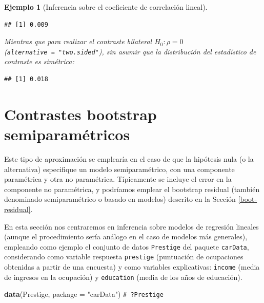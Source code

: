 \documentclass[
]{book}
\newenvironment{Shaded}{\begin{snugshade}}{\end{snugshade}}
\newcommand{\AttributeTok}[1]{\textcolor[rgb]{0.13,0.29,0.53}{#1}}
\newcommand{\CommentTok}[1]{\textcolor[rgb]{0.56,0.35,0.01}{\textit{#1}}}
\newcommand{\DecValTok}[1]{\textcolor[rgb]{0.00,0.00,0.81}{#1}}
\newcommand{\FunctionTok}[1]{\textcolor[rgb]{0.13,0.29,0.53}{\textbf{#1}}}
\newcommand{\NormalTok}[1]{#1}
\newcommand{\OtherTok}[1]{\textcolor[rgb]{0.56,0.35,0.01}{#1}}
\newcommand{\SpecialCharTok}[1]{\textcolor[rgb]{0.81,0.36,0.00}{\textbf{#1}}}
\newcommand{\StringTok}[1]{\textcolor[rgb]{0.31,0.60,0.02}{#1}}
\theoremstyle{break}
\newtheorem{example}{Ejemplo}[chapter]
\theoremstyle{nonumberplain}
\renewcommand{\CommentTok}[1]{\textcolor[rgb]{0.41,0.41,0.41}{\texttt{#1}}}
\begin{document}
\begin{example}[Inferencia sobre el coeficiente de correlación lineal]
\begin{verbatim}
## [1] 0.009
\end{verbatim}

Mientras que para realizar el contraste bilateral \(H_0: \rho = 0\)
(\texttt{alternative\ =\ "two.sided"}), sin asumir que
la distribución del estadístico de contraste es simétrica:

\begin{Shaded}
\end{Shaded}

\begin{verbatim}
## [1] 0.018
\end{verbatim}

\end{example}

\section{Contrastes bootstrap semiparamétricos}\label{contrastes-semiparametricos}

Este tipo de aproximación se emplearía en el caso de que la hipótesis nula
(o la alternativa) especifique un modelo semiparamétrico,
con una componente paramétrica y otra no paramétrica.
Típicamente se incluye el error en la componente no paramétrica, y podríamos emplear
el bootstrap residual (también denominado semiparamétrico o basado en modelos)
descrito en la Sección \ref{boot-residual}.

En esta sección nos centraremos en inferencia sobre modelos de regresión lineales (aunque el procedimiento sería análogo en el caso de modelos más generales), empleando como ejemplo el conjunto de datos \texttt{Prestige} del paquete \texttt{carData}, considerando como variable respuesta \texttt{prestige} (puntuación de ocupaciones obtenidas a partir de una encuesta) y como variables explicativas: \texttt{income} (media de ingresos en la ocupación) y \texttt{education} (media de los años de educación).

\begin{Shaded}
\begin{Highlighting}[]
\FunctionTok{data}\NormalTok{(Prestige, }\AttributeTok{package =} \StringTok{"carData"}\NormalTok{)}
\CommentTok{\# ?Prestige}
\end{Highlighting}
\end{Shaded}
\end{document}
